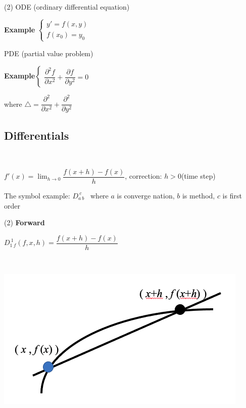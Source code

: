 \begin{tasks}(2)
	\task[ ] ODE (ordinary differential equation)

\textbf{Example} $\begin{cases}
	y' = f(x,y)\\f(x_0) = y_0
\end{cases}$

	\task[ ] PDE (partial value problem)
	
\textbf{Example}$\begin{cases}
	\dfrac{\partial^2f}{\partial x^2} + \dfrac{\partial f}{\partial y^2} = 0
\end{cases}$

where $\triangle = \dfrac{\partial^2}{\partial x^2} + \dfrac{\partial^2}{\partial y^2}$
\end{tasks}

\subsection{Differentials}$ $

$f'(x) = \lim_{h \rightarrow 0}\dfrac{f(x+h)-f(x)}{h}$, correction: $h>0$(time step)

The symbol example: $D_{a~b}^{~c}$~ where $a$ is converge nation, $b$ is method, $c$ is first order

\begin{tasks}(2)
	\task[ ] \textbf{Forward}

$D_{1~f}^{~1}(f,x,h) = \dfrac{f(x+h)-f(x)}{h}$

	\task[ ] $ $
	
	\includegraphics[scale=0.3]{figure/1}
\end{tasks}

